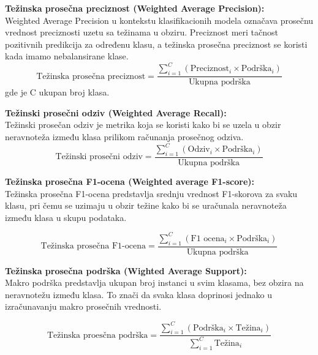 \documentclass{article}
\begin{document}
\begin{flushleft}
\textbf{Težinska prosečna preciznost (Weighted Average Precision):}\\
Weighted Average Precision u kontekstu klasifikacionih modela označava prosečnu vrednost preciznosti uzetu sa težinama u obziru. Preciznost meri tačnost pozitivnih predikcija za određenu klasu, a težinska prosečna preciznost se koristi kada imamo nebalansirane klase.  \\


\[
\text{Težinska prosečna preciznost} = \frac{\sum_{i=1}^{C} (\text{Preciznost}_i \times \text{Podrška}_i)}{\text{Ukupna podrška}}
\]
\hspace{5cm} gde je C ukupan broj klasa.
\vspace{2.75mm}


\textbf{Težinski prosečni odziv (Weighted Average Recall): }\\
Težinski prosečan odziv je metrika koja se koristi kako bi se uzela u obzir neravnoteža između klasa prilikom računanja prosečnog odziva. \\
\[
\text{Težinski prosečni odziv} = \frac{\sum_{i=1}^{C} (\text{Odziv}_i \times \text{Podrška}_i)}{\text{Ukupna podrška}}
\]
\vspace{2.75mm}

\newpage

\textbf{Težinska prosečna F1-ocena (Weighted average F1-score):}\\
Težinska prosečna F1-ocena predstavlja srednju vrednost F1-skorova za svaku klasu, pri čemu se uzimaju u obzir težine kako bi se uračunala neravnoteža između klasa u skupu podataka. 

\[
\text{Težinska prosečna F1-ocena} = \frac{\sum_{i=1}^{C} (\text{F1 ocena}_i \times \text{Podrška}_i)}{\text{Ukupna podrška}}
\]

\vspace{2.75mm}

\textbf{Težinska prosečna podrška (Wighted Average Support):}\\
Makro podrška predstavlja ukupan broj instanci u svim klasama, bez obzira na neravnotežu između klasa. To znači da svaka klasa doprinosi jednako u izračunavanju makro prosečnih vrednosti. 


\[
\text{Težinska proesčna podrška} = \frac{\sum_{i=1}^{C} (\text{Podrška}_i \times \text{Težina}_i)}{\sum_{i=1}^{C} \text{Težina}_i}
\]
\vspace{2.75mm}


\end{flushleft}
\end{document}
